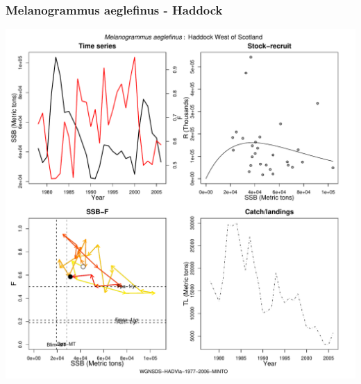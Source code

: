 \subsubsection{Melanogrammus aeglefinus - Haddock}
\begin{center}
\includegraphics[width=1.2\textwidth]{../R/figures/WGNSDS-HADVIa-1977-2006-MINTO.pdf}
\end{center}

